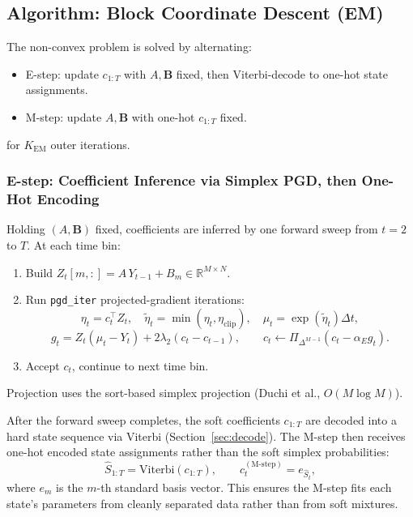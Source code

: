 \documentclass[11pt]{article}
\begin{document}
\subsection{Algorithm: Block Coordinate Descent (EM)}

The non-convex problem is solved by alternating:
\begin{itemize}
  \item E-step: update \(c_{1:T}\) with \(A,\mathbf{B}\) fixed, then Viterbi-decode to one-hot state assignments.
  \item M-step: update \(A,\mathbf{B}\) with one-hot \(c_{1:T}\) fixed.
\end{itemize}
for \(K_{\mathrm{EM}}\) outer iterations.

\subsubsection{E-step: Coefficient Inference via Simplex PGD, then One-Hot Encoding}

Holding \((A,\mathbf{B})\) fixed, coefficients are inferred by one forward
sweep from \(t=2\) to \(T\). At each time bin:
\begin{enumerate}
  \item Build \(Z_t[m,:] = A\,Y_{t-1}+B_m\in\mathbb{R}^{M\times N}\).
  \item Run \texttt{pgd\_iter} projected-gradient iterations:
  \[
    \eta_t = c_t^\top Z_t,\quad
    \tilde{\eta}_t = \min(\eta_t,\eta_{\mathrm{clip}}),\quad
    \mu_t = \exp(\tilde{\eta}_t)\Delta t,
  \]
  \[
    g_t = Z_t\left(\mu_t-Y_t\right) + 2\lambda_2(c_t-c_{t-1}),
    \qquad
    c_t \leftarrow \Pi_{\Delta^{M-1}}(c_t-\alpha_E g_t).
  \]
  \item Accept \(c_t\), continue to next time bin.
\end{enumerate}
Projection uses the sort-based simplex projection (Duchi et al., \(O(M\log M)\)).

After the forward sweep completes, the soft coefficients \(c_{1:T}\) are decoded into a hard state sequence via Viterbi (Section~\ref{sec:decode}). The M-step then receives one-hot encoded state assignments rather than the soft simplex probabilities:
\begin{equation}
  \hat{S}_{1:T} = \mathrm{Viterbi}(c_{1:T}), \qquad
  c_t^{\mathrm{(M\text{-}step)}} = e_{\hat{S}_t},
\end{equation}
where \(e_m\) is the \(m\)-th standard basis vector. This ensures the M-step fits each state's parameters from cleanly separated data rather than from soft mixtures.
\end{document}
